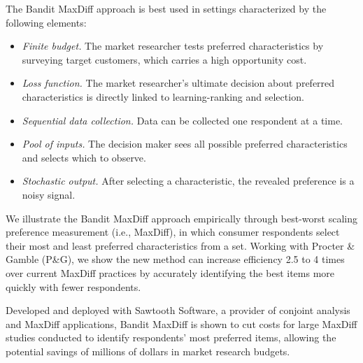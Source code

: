 \documentclass[nonblindrev]{informs3}
\begin{document}
The Bandit MaxDiff approach is best used in settings characterized by the following elements:
\begin{itemize}
\item \emph{Finite budget.} The market researcher tests preferred characteristics by surveying target customers, which carries a high opportunity cost.
\item \emph{Loss function.} The market researcher's ultimate decision about preferred characteristics is directly linked to learning-ranking and selection.
\item \emph{Sequential data collection.} Data can be collected one respondent at a time.
\item \emph{Pool of inputs.} The decision maker sees all possible preferred characteristics and selects which to observe.
\item \emph{Stochastic output.} After selecting a characteristic, the revealed preference is a noisy signal.
\end{itemize}

We illustrate the Bandit MaxDiff approach empirically through best-worst scaling preference measurement (i.e., MaxDiff), in which consumer respondents select their most and least preferred characteristics from a set. Working with Procter \& Gamble (P\&G), we show the new method can increase efficiency 2.5 to 4 times over current MaxDiff practices by accurately identifying the best items more quickly with fewer respondents. 

Developed and deployed with Sawtooth Software, a provider of conjoint analysis and MaxDiff applications, Bandit MaxDiff is shown to cut costs for large MaxDiff studies conducted to identify respondents’ most preferred items, allowing the potential savings of millions of dollars in market research budgets. 







\end{document}
